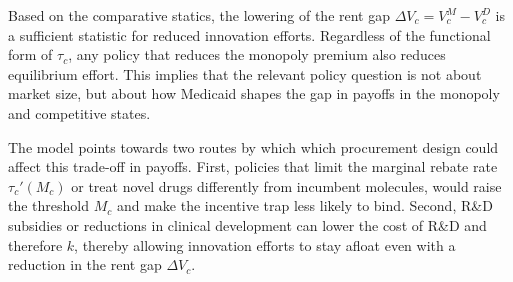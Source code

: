 \documentclass[12pt]{article}
\begin{document}
Based on the comparative statics, the lowering of the rent gap $\Delta V_c = V_c^M - V_c^D$ is a sufficient statistic for reduced innovation efforts. Regardless of the functional form of $\tau_c$, any policy that reduces the monopoly premium also reduces equilibrium effort. This implies that the relevant policy question is not about market size, but about how Medicaid shapes the gap in payoffs in the monopoly and competitive states.

The model points towards two routes by which which procurement design could affect this trade-off in payoffs. First, policies that limit the marginal rebate rate $\tau_c'(M_c)$ or treat novel drugs differently from incumbent molecules, would raise the threshold $M_c$ and make the incentive trap less likely to bind. Second, R\&D subsidies or reductions in clinical development can lower the cost of R\&D and therefore $k$, thereby allowing innovation efforts to stay afloat even with a reduction in the rent gap $\Delta V_c$.

\newpage



\end{document}
